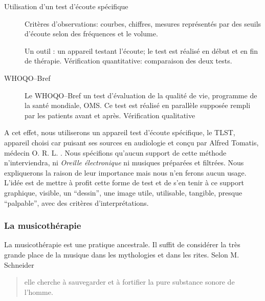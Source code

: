 \begin{description}
	\item[Utilisation d'un test d'écoute spécifique] Critères d'observations: courbes, chiffres, mesures représentés par des seuils d'écoute selon des fréquences et le volume. 
		
	Un outil :  un appareil testant l'écoute; le test est réalisé en début et en fin de thérapie. 
	Vérification quantitative: comparaison des deux tests.
	
	\item[WHOQO--Bref] Le WHOQO--Bref un test d'évaluation de la qualité de vie, programme de la santé mondiale, OMS.
	Ce test est réalisé en parallèle supposée rempli par les patients avant et après.
	Vérification qualitative
	
	
	 
\end{description}











	




A cet effet, nous utiliserons un appareil test d'écoute spécifique, le TLST, appareil choisi car puisant ses sources en audiologie et conçu par Alfred Tomatis, médecin O. R. L. .
Nous spécifions qu'aucun support de cette méthode n'interviendra, ni 
\textsl{Oreille
	électronique} ni musiques préparées et filtrées. Nous expliquerons la 
raison de   leur importance mais nous n'en ferons aucun usage. L'idée est de 
mettre à profit cette forme de test et de  s'en tenir à ce support
graphique, visible, un ``dessin'', une image utile, utilisable, tangible,
presque ``palpable'', avec des critères
d'interprétations.
	



 



\subsubsection{La musicothérapie}
La musicothérapie est une pratique ancestrale. Il suffit de considérer la très 
grande  place de la musique dans les mythologies et dans les rites.  Selon M. 
Schneider \blockquote{elle cherche à sauvegarder et à fortifier la pure 
substance sonore de l'homme\autocite[Voir tome I, pp. 202--203]%
	[M. Schneider, <<Le rôle  de la musique dans la mythologie et les rites 
des civilisations non européennes>>]{schaeffner.ea:histoire}.}

